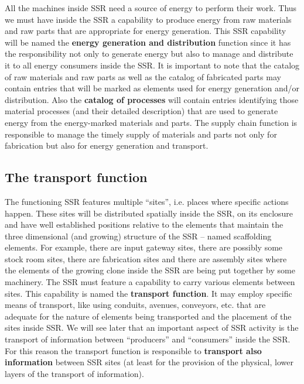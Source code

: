 \hypertarget{RefHeading3068306210128}{}All the machines inside SSR need
a source of energy to perform their work. Thus we must have inside the
SSR a capability to produce energy from raw materials and raw parts
that are appropriate for energy generation. This SSR capability will be
named the \textbf{energy generation and distribution }function since it
has the responsibility not only to generate energy but also to manage
and distribute it to all energy consumers inside the SSR. It is
important to note that the catalog of raw materials and raw parts as
well as the catalog of fabricated parts may contain entries that will
be marked as elements used for energy generation and/or distribution.
Also the \textbf{catalog of processes} will contain entries identifying
those material processes (and their detailed description) that are used
to generate energy from the energy-marked materials and parts. The
supply chain function is responsible to manage the timely supply of
materials and parts not only for fabrication but also for energy
generation and transport.

\subsection[The transport function]{The transport function}

\hypertarget{RefHeading3070306210128}{}The functioning SSR features
multiple “sites”, i.e. places where specific actions happen. These
sites will be distributed spatially inside the SSR, on its enclosure
and have well established positions relative to the elements that
maintain the three dimensional (and growing) structure of the SSR –
named scaffolding elements. For example, there are input gateway sites,
there are possibly some stock room sites, there are fabrication sites
and there are assembly sites where the elements of the growing clone
inside the SSR are being put together by some machinery. The SSR must
feature a capability to carry various elements between sites. This
capability is named the \textbf{transport function}. It may employ
specific means of transport, like using conduits, avenues, conveyors,
etc. that are adequate for the nature of elements being transported and
the placement of the sites inside SSR.  We will see later that an
important aspect of SSR activity is the transport of information
between “producers” and “consumers” inside the SSR. For this reason the
transport function is responsible to \textbf{transport also
information} between SSR sites (at least for the provision of the
physical, lower layers of the transport of information).

